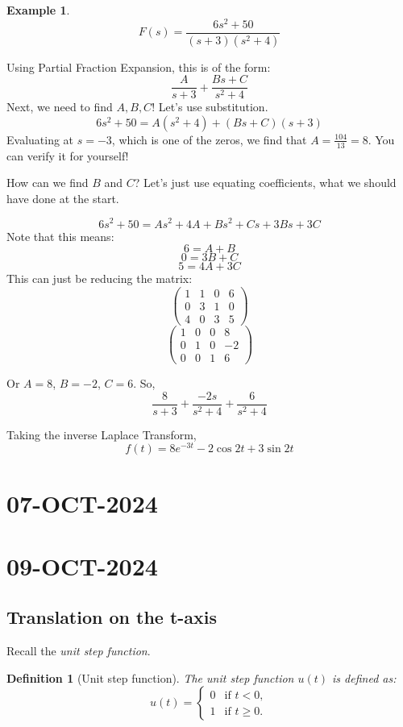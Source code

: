 \documentclass{article}
\newtheorem{defn}{Definition}
\theoremstyle{definition}
\newtheorem{example}{Example}[section]
\begin{document}
\begin{example}
    \[ F(s) = \frac{6s^2+50}{(s+3)(s^2+4)}  \]

    Using Partial Fraction Expansion, this is of the form:
    \[\frac{A}{s+3} + \frac{Bs + C}{s^2 + 4} \]
    Next, we need to find $A, B, C$! Let's use substitution.
    \[6s^2 + 50 = A(s^2 + 4) + (Bs + C)(s + 3)\]
Evaluating at $s = -3$, which is one of the zeros, we find that $A = \frac{104}{13} = 8$. You can verify it for yourself!

How can we find $B$ and $C$? Let's just use equating coefficients, what we should have done at the start.

\[6s^2 + 50 = As^2 + 4A + Bs^2 + Cs + 3Bs + 3C\]
Note that this means:
\[6 = A + B \]
\[0 = 3B + C \]
\[5 = 4A + 3C \]
This can just be reducing the matrix:
\[ \left( \begin{array}{rrr|r} 1 &1 &0 &6 \\ 0 &3 &1 &0 \\4 &0 &3 &5 \end{array} \right) \]
\[ \left( \begin{array}{rrr|r} 1 &0 &0 &8 \\ 0 &1 &0 &-2 \\0 &0 &1 &6 \end{array} \right) \]

Or $A = 8$, $B = -2$, $C = 6$. So,
\[\frac{8}{s+3} + \frac{-2s}{s^2 + 4} + \frac{6}{s^2 + 4} \]

Taking the inverse Laplace Transform,
\[f(t) = 8e^{-3t} - 2\cos{2t} + 3\sin{2t}\]

\end{example}
\section{07-OCT-2024}

\section{09-OCT-2024}
\subsection{Translation on the t-axis}
Recall the \textit{unit step function}.
\begin{defn}[Unit step function]
The unit step function $u(t)$ is defined as:
\[
u(t) =
\begin{cases} 
0 & \text{if } t < 0, \\
1 & \text{if } t \geq 0.
\end{cases}
\]
\end{defn}
\end{document}

